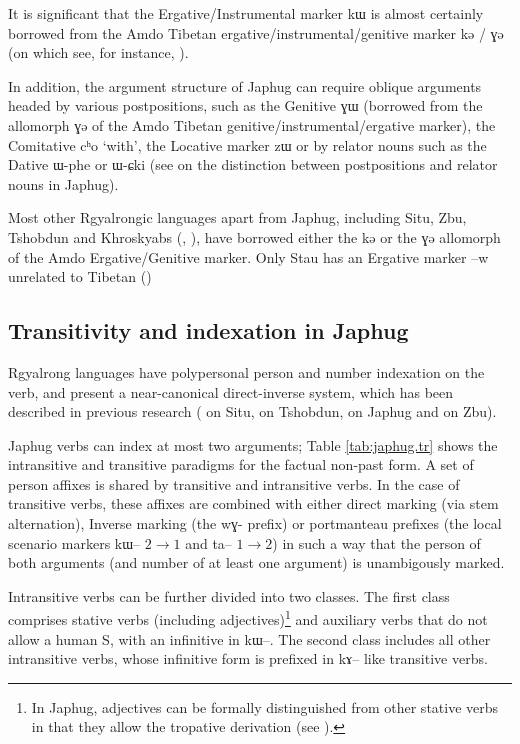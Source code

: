 \documentclass[oldfontcommands,oneside,a4paper,11pt]{article}
\newcommand{\ipa}[1]{{\phon \mbox{#1}}} %
\begin{document}
It is significant that the Ergative/Instrumental marker \ipa{kɯ} is almost certainly borrowed from the Amdo Tibetan ergative/instrumental/genitive marker \ipa{kə} / \ipa{ɣə} (on which see, for instance, \citealt[62]{haller04themchen}).

In addition, the argument structure of Japhug can require oblique arguments headed by various postpositions, such as the Genitive \ipa{ɣɯ} (borrowed from the allomorph \ipa{ɣə} of the Amdo Tibetan genitive/instrumental/ergative marker), the Comitative \ipa{cʰo} `with', the Locative marker \ipa{zɯ} or by relator nouns such as the Dative  \ipa{ɯ-phe} or \ipa{ɯ-ɕki} (see \citealt[272-4]{jacques14linking} on the distinction between postpositions and relator nouns in Japhug).

Most other Rgyalrongic languages apart from Japhug, including Situ, Zbu, Tshobdun and Khroskyabs (\citealt{jackson98morphology}, \citealt{lai13affixale}), have borrowed either the \ipa{kə} or the \ipa{ɣə} allomorph of the Amdo  Ergative/Genitive marker. Only Stau has an Ergative marker \ipa{--w} unrelated to Tibetan (\citealt{jacques14rtau})

\subsection{Transitivity and indexation in Japhug}
Rgyalrong languages have polypersonal person and number indexation on the verb, and present a near-canonical direct-inverse system, which has been described in previous research (\citealt{delancey81direction} on Situ,  \citealt{jackson02rentongdengdi} on Tshobdun,  \citealt{jacques10inverse} on Japhug and \citealt{gongxun14agreement} on Zbu). 

Japhug verbs can index at most two arguments; Table \ref{tab:japhug.tr} shows the intransitive and transitive paradigms for the factual non-past form. A set of person affixes is shared by transitive and intransitive verbs. In the case of transitive verbs, these affixes are combined with either direct marking (via stem alternation), Inverse marking (the \ipa{wɣ-} prefix) or portmanteau prefixes (the local scenario markers \ipa{kɯ--} $2\rightarrow1$ and \ipa{ta--} $1\rightarrow2$) in such a way that the person of both arguments (and number of at least one argument) is unambigously marked.

Intransitive verbs can be further divided into two classes. The first class comprises stative verbs (including adjectives)\footnote{In Japhug, adjectives can be formally distinguished from other stative verbs in that they allow the tropative derivation (see \citealt{jacques13tropative}).} and auxiliary verbs that do not allow a human S, with an infinitive in \ipa{kɯ--}. The second class includes all other intransitive verbs, whose infinitive form is prefixed in \ipa{kɤ--} like transitive verbs.
\end{document}
